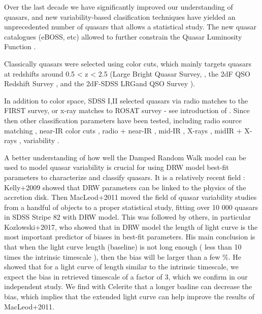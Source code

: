 \documentclass[modern]{aastex62}
\begin{document}
Over the last decade we have significantly improved our understanding of quasars, and new variability-based clasification techniques \citep{fan2001, richards2006, kozlowski2010, palanque2011, macleod2011, graham2014, alsayyad2016, ruan2017} have yielded an unprecedented number of quasars that allows a statistical study. The new quasar catalogues (eBOSS, etc) allowed  to further constrain the Quasar Luminosity Function \citep{ross2013, myers2015, palanque2016}.

Classically quasars were selected using color cuts,  which mainly targets quasars at redshifts around 0.5 < z < 2.5 (Large Bright Quasar Survey, \cite{hewett1995}, the 2dF QSO Redshift Survey \cite{croom2004}, and the 2dF-SDSS LRGand QSO Survey \cite{croom2009}). 


In addition to color space, SDSS I,II selected quasars via radio matches to the FIRST survey, or x-ray matches to ROSAT survey  - see introduction of \citep{myers2015}. Since then other classification parameters have been tested, including radio source matching \citep{mcgreer2009}, near-IR color cuts \citep{banerji2012},  radio + near-IR \citep{glikman2012}, mid-IR \citep{stern2005, richards2009a, stern2012}, X-rays \citep{trichas2012},  midIR + X-rays \citep{lacy2004, hickox2007, hickox2009}, variability \citep{schmidt2010, butler2011, macleod2011, palanque2011}. 

 
A better understanding of how well the Damped Random Walk model can be used to model quasar variability is crucial for using DRW model best-fit parameters to characterize and classify quasars. It is a relatively recent field : Kelly+2009 showed that DRW parameters can be linked to the physics of the accretion disk.  Then  MacLeod+2011 moved the field of quasar variability studies from a handful of objects to a proper statistical study, fitting over 10 000 quasars in SDSS Stripe 82 with DRW model. This was followed by others, in particular Kozlowski+2017, who showed that in DRW model the length of light curve is the most important predictor of biases in best-fit parameters.  His main conclusion is that when the light curve length (baseline) is not long enough ( less than 10 times the intrinsic timescale ), then the bias will be larger than a few \%. He showed that for a light curve of length similar to the intrinsic timescale, we expect the bias in retrieved timescale of a factor of 3, which we confirm in our independent study.  We find with Celerite that a longer basline can decrease the bias, which implies that the extended light curve can help improve the results of MacLeod+2011.  
\end{document}
